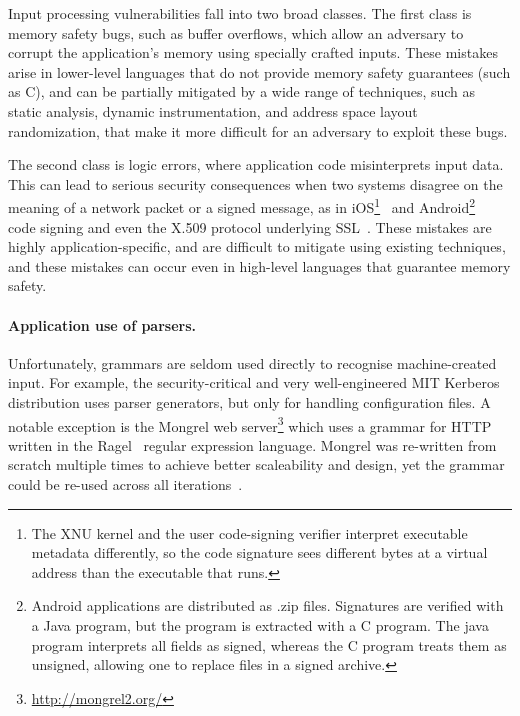 Input processing vulnerabilities fall into two broad classes.  The first
class is memory safety bugs, such as buffer overflows, which allow an
adversary to corrupt the application's memory using specially crafted
inputs.  These mistakes arise in lower-level languages that do not
provide memory safety guarantees (such as C), and can be partially
mitigated by a wide range of techniques, such as static analysis,
dynamic instrumentation, and address space layout randomization, that
make it more difficult for an adversary to exploit these bugs.

The second class is logic errors, where application code misinterprets
input data.  This can lead to serious security consequences when two
systems disagree on the meaning of a network packet or a signed message,
as in iOS\footnote{The XNU kernel and the user code-signing verifier
interpret executable metadata differently, so the code signature
sees different bytes at a virtual address than the executable that
runs.}~\cite{evaders6} and Android\footnote{Android applications
are distributed as .zip files. Signatures are verified with a Java
program, but the program is extracted with a C program.  The java
program interprets all fields as signed, whereas the C program
treats them as unsigned, allowing one to replace files in a signed
archive.}~\cite{saurik-masterkey} code signing and even the X.509 protocol
underlying SSL~\cite{DBLP:conf/fc/KaminskyPS10}.  These mistakes are
highly application-specific, and are difficult to mitigate using existing
techniques, and these mistakes can occur even in high-level languages
that guarantee memory safety.

\paragraph{Application use of parsers.}

Unfortunately, grammars are seldom used directly to recognise
machine-created input. For example, the security-critical and very
well-engineered MIT Kerberos distribution uses parser generators, but
only for handling configuration files. A notable exception is the Mongrel
web server\footnote{\url{http://mongrel2.org/}} which uses a grammar
for HTTP written in the Ragel~\cite{ragel-paper} regular expression
language. Mongrel was re-written from scratch multiple times to achieve
better scaleability and design, yet the grammar could be  re-used across
all iterations~\cite{patterson-citation}.



